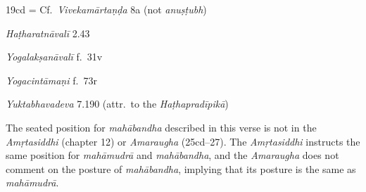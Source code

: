 \begin{ekdosis}
\begin{sources}[hp03_019]
19cd = Cf.~\emph{Vivekamārtaṇḍa} 8a (not \emph{anuṣṭubh})
\begin{versinnote}
\end{versinnote}
\end{sources}

\begin{testimonia}[hp03_019]
\emph{Haṭharatnāvalī} 2.43
\begin{versinnote}
\end{versinnote}

\emph{Yogalakṣanāvalī} f.~31v
\begin{versinnote}
\end{versinnote}

\emph{Yogacintāmaṇi} f.~73r
\begin{versinnote}
\end{versinnote}

\emph{Yuktabhavadeva} 7.190 (attr.~to the \emph{Haṭhapradīpikā})
\begin{versinnote}
\end{versinnote}
\end{testimonia}

\begin{philcomm}[hp03_019]
The seated position for \emph{mahābandha} described in this verse is not in the \emph{Amṛtasiddhi} (chapter 12) or \emph{Amaraugha} (25cd–27). The \emph{Amṛtasiddhi} instructs the same position for \emph{mahāmudrā} and \emph{mahābandha}, and the \emph{Amaraugha} does not comment on the posture of \emph{mahābandha}, implying that its posture is the same as \emph{mahāmudrā}.
\end{philcomm}


\end{ekdosis}
